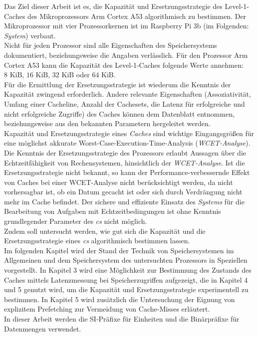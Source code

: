 \documentclass[]{scrbook}
\begin{document}
Das Ziel dieser Arbeit ist es, die Kapazität und Ersetzungsstrategie des Level-1-Caches des Mikroprozessors Arm Cortex A53 algorithmisch zu bestimmen.
Der Mikroprozessor mit vier Prozessorkernen ist im Raspberry Pi 3b (im Folgenden: \textsl{\gls{System}}) verbaut. 
\\
Nicht für jeden Prozessor sind alle Eigenschaften des Speichersystems dokumentiert, beziehungsweise die Angaben verlässlich.
Für den Prozessor Arm Cortex A53 kann die Kapazität des Level-1-Caches folgende Werte annehmen: $8 \textrm{ KiB}$, $16 \textrm{ KiB}$, $32 \textrm{ KiB}$ oder $64 \textrm{ KiB}$. \cite[S.\,18]{a53trm}
\\
Für die Ermittlung der Ersetzungsstrategie ist wiederum die Kenntnis der Kapazität zwingend erforderlich.
Andere relevante Eigenschaften (Assoziativität, Umfang einer Cacheline, Anzahl der Cachesets, die Latenz für erfolgreiche und nicht erfolgreiche Zugriffe) des Caches können dem Datenblatt \cite{a53trm} entnommen, beziehungsweise aus den bekannten Parametern hergeleitet werden.
\\
Kapazität und Ersetzungsstrategie eines \textsl{Caches} sind wichtige Eingangsgrößen für eine möglichst akkurate Worst-Case-Execution-Time-Analysis (\textsl{WCET-Analyse}).
Die Kenntnis der Ersetzungsstrategie des Prozessors erlaubt Aussagen über die Echtzeitfähigkeit von Rechensystemen, hinsichtlich der \textsl{WCET-Analyse}.
Ist die Ersetzungsstrategie nicht bekannt, so kann der Performance-verbessernde Effekt von Caches bei einer WCET-Analyse nicht berücksichtigt werden, da nicht vorhersagbar ist, ob ein Datum gecacht ist oder sich durch Verdrängung nicht mehr im Cache befindet.
Der sichere und effiziente Einsatz des \textsl{\gls{System}s} für die Bearbeitung von Aufgaben mit Echtzeitbedingungen ist ohne Kenntnis grundlegender Parameter des \textsl{\gls{c}s} nicht möglich. 
\\
Zudem soll untersucht werden, wie gut sich die Kapazität und die Ersetzungsstrategie eines \textsl{\gls{c}s} algorithmisch bestimmen lassen.
\\
Im folgenden Kapitel wird der Stand der Technik von Speichersystemen im Allgemeinen und dem Speichersystem des untersuchten Prozessors in Speziellen vorgestellt.
In Kapitel 3 wird eine Möglichkeit zur Bestimmung des Zustands des Caches mittels Latenzmessung bei Speicherzugriffen aufgezeigt, die in Kapitel 4 und 5 genutzt wird, um die Kapazität und Ersetzungsstrategie experimentell zu bestimmen. In Kapitel 5 wird zusätzlich die Untersuchung der Eignung von explizitem Prefetching zur Vermeidung von Cache-Misses erläutert.
\\
In dieser Arbeit werden die SI-Präfixe für Einheiten und die Binärpräfixe für Datenmengen verwendet.
\end{document}
